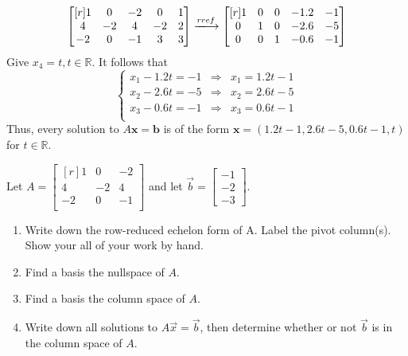 \documentclass{article}
\theoremstyle{definition}
\newenvironment{solution}[1][]{\begin{replacementsoln}}{\end{replacementsoln}}
\begin{document}
\begin{solution}
\[
  \begin{bmatrix}[r]
    1&0&-2&0&1\\
    4&-2&4&-2&2\\
    -2&0&-1&3&3\\
    \end{bmatrix}\xlongrightarrow{rref} \begin{bmatrix}[r]
      1 &0  & 0 &-1.2  &-1   \\
       0&1  &0  &-2.6  &-5   \\
       0&0  &1  &-0.6  &-1   \\
    \end{bmatrix}
\]
Give \(x_4 = t,t\in\mathbb{R}\). It follows that 
\[
  \left\{
    \begin{array}{ccc}
      x_1 - 1.2t = -1& \Longrightarrow &x_1 = 1.2t - 1\\
      x_2 - 2.6t = -5& \Longrightarrow &x_2 = 2.6t - 5\\
      x_3 - 0.6t = -1& \Longrightarrow &x_3 = 0.6t - 1\\
    \end{array}
  \right.
\]
Thus, every solution to \(A \mathbf{x}=\mathbf{b}\) is of the form \(\mathbf{x}= \left( 1.2t-1,2.6t-5,0.6t-1,t \right) \) for \(t\in\mathbb{R}\).
\end{solution}

\begin{exercise}
    Let  $A=\begin{bmatrix}[r]
    1&0&-2\\
    4&-2&4\\
    -2&0&-1\\
    \end{bmatrix}$ and let $\vec{b} =\begin{bmatrix}
    -1\\-2\\-3
    \end{bmatrix}.$
    \begin{enumerate}
    \item Write down the row-reduced echelon form of A.  Label the pivot column(s). Show your all of your work by hand.  
    \item Find a basis the nullspace of $A$.  
    \item Find a basis the column space of $A$.
    \item Write down all solutions to $A\vec{x}=\vec{b}$, then determine whether or not $\vec{b}$ is in the column space of $A$. 
    \end{enumerate}
\end{exercise}
\end{document}
